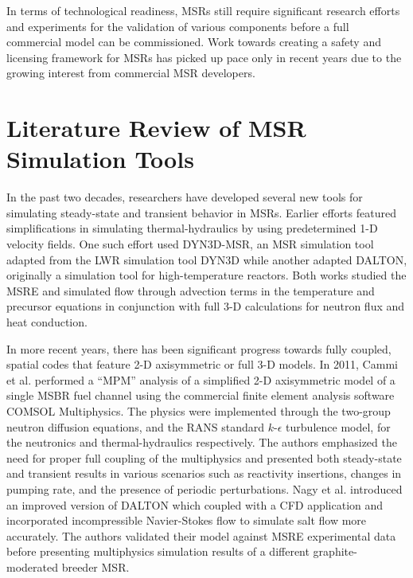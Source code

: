 In terms of technological readiness, \glspl{MSR} still require significant
research efforts and experiments for the validation of
various components before a full commercial model can be commissioned. Work
towards creating a safety and licensing framework for \glspl{MSR} has picked
up pace only in recent years due to the growing interest from commercial
\gls{MSR} developers.

\section{Literature Review of MSR Simulation Tools} \label{sec:litrev}

In the past two decades, researchers have developed several
new tools for simulating steady-state and transient behavior in \glspl{MSR}.
Earlier efforts featured simplifications in simulating
thermal-hydraulics by using predetermined 1-D velocity fields. One such effort
\cite{krepel_dyn3d-msr_2007} used DYN3D-MSR, an \gls{MSR} simulation tool
adapted from the \gls{LWR} simulation tool DYN3D while another
\cite{kophazi_development_2009} adapted DALTON, originally a simulation
tool for high-temperature reactors. Both works studied the \gls{MSRE} and
simulated flow through advection terms in the temperature and precursor
equations in conjunction with full 3-D calculations for neutron flux and heat
conduction.

In more recent years, there has been
significant progress towards fully coupled, spatial codes that feature
2-D axisymmetric or full 3-D models. In 2011, Cammi et al.
\cite{cammi_multi-physics_2011} performed a ``\gls{MPM}'' analysis
of a simplified 2-D axisymmetric model of a single \gls{MSBR} fuel channel
using the commercial finite element analysis software COMSOL Multiphysics. The
physics were implemented through the two-group neutron diffusion equations,
and the \gls{RANS} standard $k$-$\epsilon$ turbulence model, for the
neutronics and thermal-hydraulics respectively. The
authors emphasized the need for proper full coupling of the multiphysics and
presented both steady-state and transient results in various
scenarios such as reactivity insertions, changes in pumping rate, and the
presence of periodic perturbations. Nagy et al. \cite{nagy_steady-state_2014}
introduced an improved version of DALTON which coupled with a \gls{CFD}
application and incorporated incompressible
Navier-Stokes flow to simulate salt flow more accurately. The authors
validated their model against \gls{MSRE} experimental data before presenting
multiphysics simulation results of a different graphite-moderated breeder
\gls{MSR}.

